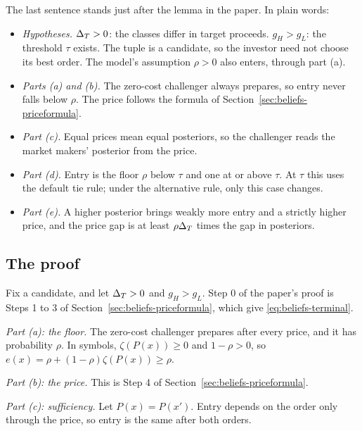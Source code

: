 The last sentence stands just after the lemma in the paper. In plain words:
\begin{itemize}
\item \emph{Hypotheses.} \(\Delta_T>0\): the classes differ in target proceeds. \(g_H>g_L\): the threshold \(\tau\) exists. The tuple is a candidate, so the investor need not choose its best order. The model's assumption \(\rho>0\) also enters, through part (a).
\item \emph{Parts (a) and (b).} The zero-cost challenger always prepares, so entry never falls below \(\rho\). The price follows the formula of Section~\ref{sec:beliefs-priceformula}.
\item \emph{Part (c).} Equal prices mean equal posteriors, so the challenger reads the market makers' posterior from the price.
\item \emph{Part (d).} Entry is the floor \(\rho\) below \(\tau\) and one at or above \(\tau\). At \(\tau\) this uses the default tie rule; under the alternative rule, only this case changes.
\item \emph{Part (e).} A higher posterior brings weakly more entry and a strictly higher price, and the price gap is at least \(\rho\Delta_T\) times the gap in posteriors.
\end{itemize}

\subsection{The proof}

Fix a candidate, and let \(\Delta_T>0\) and \(g_H>g_L\). Step 0 of the paper's proof is Steps 1 to 3 of Section~\ref{sec:beliefs-priceformula}, which give \eqref{eq:beliefs-terminal}.

\emph{Part (a): the floor.} The zero-cost challenger prepares after every price, and it has probability \(\rho\). In symbols, \(\zeta(P(x))\ge0\) and \(1-\rho>0\), so \(e(x)=\rho+(1-\rho)\zeta(P(x))\ge\rho\).

\emph{Part (b): the price.} This is Step 4 of Section~\ref{sec:beliefs-priceformula}.

\emph{Part (c): sufficiency.} Let \(P(x)=P(x')\). Entry depends on the order only through the price, so entry is the same after both orders.


